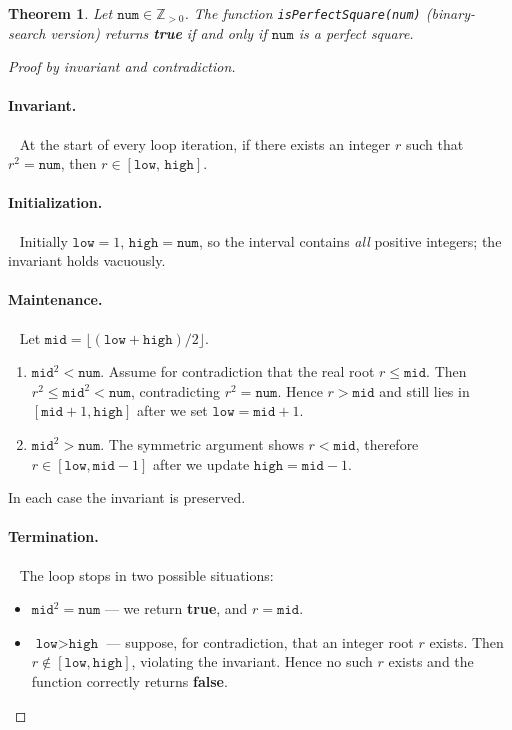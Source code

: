\documentclass[12pt]{article}
\newtheorem{theorem}{Theorem}
\begin{document}
\begin{theorem}
Let $\texttt{num}\in\mathbb{Z}_{>0}$.  
The function \texttt{isPerfectSquare(num)} (binary-search version) returns
\textbf{true} if and only if $\texttt{num}$ is a perfect square.
\end{theorem}

\begin{proof}[Proof by invariant and contradiction]
%
\paragraph{Invariant.}~%
At the start of every loop iteration, if there exists an integer
$r$ such that $r^2=\texttt{num}$, then $r\in[\texttt{low},\,\texttt{high}]$.

\paragraph{Initialization.}~%
Initially $\texttt{low}=1,\,\texttt{high}=\texttt{num}$, so the interval
contains \emph{all} positive integers; the invariant holds vacuously.

\paragraph{Maintenance.}~%
Let $\texttt{mid}=\bigl\lfloor(\texttt{low}+\texttt{high})/2\bigr\rfloor$.

\begin{enumerate}[label=\textbf{Case \arabic*:}, wide=0pt]
  \item $\texttt{mid}^2<\texttt{num}$.  
        Assume for contradiction that the real root $r\le\texttt{mid}$.  
        Then $r^2\le\texttt{mid}^2<\texttt{num}$, contradicting $r^2=\texttt{num}$.  
        Hence $r>\texttt{mid}$ and still lies in
        $[\texttt{mid}+1,\texttt{high}]$ after we set
        $\texttt{low}=\texttt{mid}+1$.
  \item $\texttt{mid}^2>\texttt{num}$.  
        The symmetric argument shows $r<\texttt{mid}$, therefore
        $r\in[\texttt{low},\texttt{mid}-1]$ after we update
        $\texttt{high}=\texttt{mid}-1$.
\end{enumerate}
In each case the invariant is preserved.

\paragraph{Termination.}~%
The loop stops in two possible situations:
\begin{itemize}
  \item $\texttt{mid}^2=\texttt{num}$ --- we return \textbf{true}, and $r=\texttt{mid}$.
  \item $\texttt{low}>\texttt{high}$ --- suppose, for contradiction, that an
        integer root $r$ exists.  Then $r\notin[\texttt{low},\texttt{high}]$,
        violating the invariant.  Hence no such $r$ exists and the function
        correctly returns \textbf{false}.
\end{itemize}
\end{proof}
\end{document}
